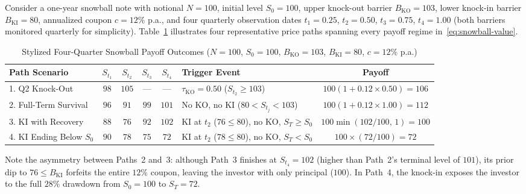 \begin{example}\label{ex:snowball-payoffs}
    Consider a one-year snowball note with notional $N = 100$, initial level $S_0 = 100$, upper knock-out barrier $B_{\mathrm{KO}} = 103$, lower knock-in barrier $B_{\mathrm{KI}} = 80$, annualized coupon $c = 12\%$ p.a., and four quarterly observation dates $t_1 = 0.25$, $t_2 = 0.50$, $t_3 = 0.75$, $t_4 = 1.00$ (both barriers monitored quarterly for simplicity). Table~\ref{tab:snowball-paths} illustrates four representative price paths spanning every payoff regime in~\eqref{eq:snowball-value}.

    \begin{table}[!htbp]
        \centering
        \small
        \caption{Stylized Four-Quarter Snowball Payoff Outcomes ($N = 100$, $S_0 = 100$, $B_{\mathrm{KO}} = 103$, $B_{\mathrm{KI}} = 80$, $c = 12\%$ p.a.)}\label{tab:snowball-paths}
        \begin{tabular}{l c c c c l c}
            \toprule
            \textbf{Path Scenario} & $S_{t_1}$ & $S_{t_2}$ & $S_{t_3}$ & $S_{t_4}$ & \textbf{Trigger Event} & \textbf{Payoff} \\
            \midrule
            1. Q2 Knock-Out         & $98$ & $105$ & ---  & ---  & $\tau_{\mathrm{KO}} = 0.50$ ($S_{t_2} \ge 103$)      & $100(1 + 0.12 \times 0.50) = 106$ \\
            2. Full-Term Survival   & $96$ & $91$  & $99$ & $101$ & No KO, no KI ($80 < S_{t_j} < 103$)                 & $100(1 + 0.12 \times 1.00) = 112$ \\
            3. KI with Recovery     & $88$ & $76$  & $92$ & $102$ & KI at $t_2$ ($76 \le 80$), no KO, $S_T \ge S_0$     & $100\min(102/100,\, 1) = 100$ \\
            4. KI Ending Below $S_0$& $90$ & $78$  & $75$ & $72$  & KI at $t_2$ ($78 \le 80$), no KO, $S_T < S_0$       & $100 \times (72/100) = 72$ \\
            \bottomrule
        \end{tabular}
    \end{table}

    Note the asymmetry between Paths~2 and~3: although Path~3 finishes at $S_{t_4} = 102$ (higher than Path~2's terminal level of $101$), its prior dip to $76 \le B_{\mathrm{KI}}$ forfeits the entire $12\%$ coupon, leaving the investor with only principal ($100$). In Path~4, the knock-in exposes the investor to the full $28\%$ drawdown from $S_0 = 100$ to $S_T = 72$.
\end{example}

